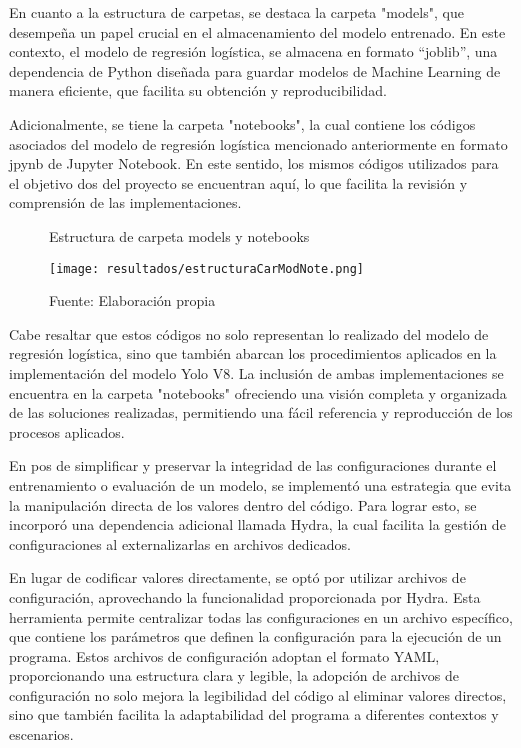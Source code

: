 En cuanto a la estructura de carpetas, se destaca la carpeta "models", que desempeña un papel crucial en el almacenamiento del modelo entrenado. En este contexto, el modelo de regresión logística, se almacena en formato “joblib”, una dependencia de Python diseñada para guardar modelos de Machine Learning de manera eficiente, que facilita su obtención y reproducibilidad. \newline

Adicionalmente, se tiene la carpeta "notebooks", la cual contiene los códigos asociados del modelo de regresión logística mencionado anteriormente en formato jpynb de Jupyter Notebook. En este sentido, los mismos códigos utilizados para el objetivo dos del proyecto se encuentran aquí, lo que facilita la revisión y comprensión de las implementaciones.


\begin{figure}[h]
\centering
\caption{Estructura de carpeta models y notebooks}
\texttt{[image: resultados/estructuraCarModNote.png]}
\caption*{\footnotesize Fuente: Elaboración propia}
\label{fig:figuraEstructuraCarModNote}
\end{figure}

\newpage

Cabe resaltar que estos códigos no solo representan lo realizado del modelo de regresión logística, sino que también abarcan los procedimientos aplicados en la implementación del modelo Yolo V8. La inclusión de ambas implementaciones se encuentra en la carpeta "notebooks" ofreciendo una visión completa y organizada de las soluciones realizadas, permitiendo una fácil referencia y reproducción de los procesos aplicados. \newline

En pos de simplificar y preservar la integridad de las configuraciones durante el entrenamiento o evaluación de un modelo, se implementó una estrategia que evita la manipulación directa de los valores dentro del código. Para lograr esto, se incorporó una dependencia adicional llamada Hydra, la cual facilita la gestión de configuraciones al externalizarlas en archivos dedicados.

\newpage

En lugar de codificar valores directamente, se optó por utilizar archivos de configuración, aprovechando la funcionalidad proporcionada por Hydra. Esta herramienta permite centralizar todas las configuraciones en un archivo específico, que contiene los parámetros que definen la configuración para la ejecución de un programa. Estos archivos de configuración adoptan el formato YAML, proporcionando una estructura clara y legible, la adopción de archivos de configuración no solo mejora la legibilidad del código al eliminar valores directos, sino que también facilita la adaptabilidad del programa a diferentes contextos y escenarios. \newline

